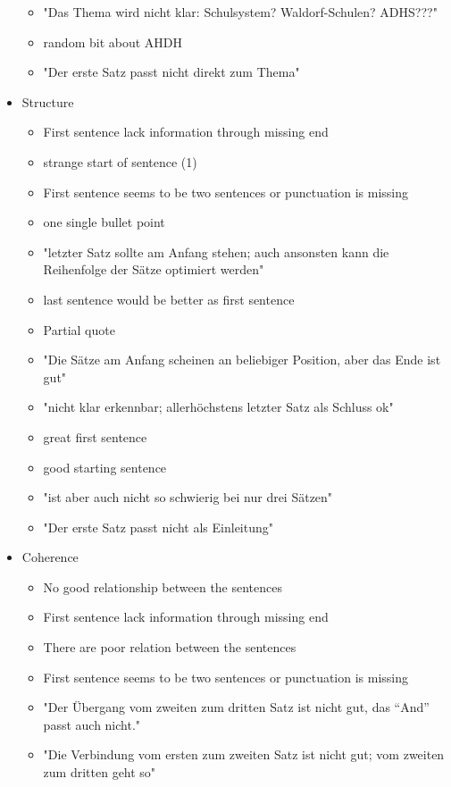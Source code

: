 \begin{itemize}[topsep = 0pt, itemsep = 0pt]
\begin{itemize}[topsep = 0pt, itemsep = 0pt]
		\item "Das Thema wird nicht klar: Schulsystem? Waldorf-Schulen? ADHS???"
		\item random bit about AHDH
		\item "Der erste Satz passt nicht direkt zum Thema"
	\end{itemize}
	\item Structure
	\begin{itemize}[topsep = 0pt, itemsep = 0pt]
		\item First sentence lack information through missing end
		\item strange start of sentence (1)
		\item First sentence seems to be two sentences or punctuation is missing
		\item one single bullet point
		\item "letzter Satz sollte am Anfang stehen; auch ansonsten kann die Reihenfolge der Sätze  optimiert werden"
		\item last sentence would be better as first sentence
		\item Partial quote
		\item "Die Sätze am Anfang scheinen an beliebiger Position, aber das Ende ist gut"
		\item "nicht klar erkennbar; allerhöchstens letzter Satz als Schluss ok"
		\item great first sentence
		\item good starting sentence
		\item "ist aber auch nicht so schwierig bei nur drei Sätzen"
		\item "Der erste Satz passt nicht als Einleitung"
	\end{itemize}	
	\item Coherence
	\begin{itemize}[topsep = 0pt, itemsep = 0pt]
		\item No good relationship between the sentences
		\item First sentence lack information through missing end
		\item There are poor relation between the sentences
		\item First sentence seems to be two sentences or punctuation is missing
		\item "Der Übergang vom zweiten zum dritten Satz ist nicht gut, das “And” passt auch nicht."
		\item "Die Verbindung vom ersten zum zweiten Satz ist nicht gut; vom zweiten zum dritten geht so"

\end{itemize}
\end{itemize}
